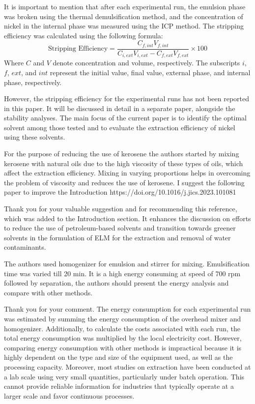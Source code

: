 \documentclass[11pt,answers]{exam}
\begin{document}
\begin{questions}
\begin{solutionorbox}[5.5cm]
It is important to mention that after each experimental run, the emulsion phase was broken using the thermal demulsification method, and the concentration of nickel in the internal phase was measured using the ICP method. The stripping efficiency was calculated using the following formula:
\begin{equation}
    \text{Stripping  Efficiency}=\frac{C_{f,int}V_{f,int}}{C_{i,ext}V_{i,ext}-C_{f,ext}V_{f,ext}}\times 100
\end{equation}
Where $C$ and $V$ denote concentration and volume, respectively. The subscripts $i$, $f$, $ext$, and $int$ represent the initial value, final value, external phase, and internal phase, respectively.

However, the stripping efficiency for the experimental runs has not been reported in this paper. It will be discussed in detail in a separate paper, alongside the stability analyses. The main focus of the current paper is to identify the optimal solvent among those tested and to evaluate the extraction efficiency of nickel using these solvents.
 \end{solutionorbox}
\question For the purpose of reducing the use of kerosene the authors started by mixing kerosene with natural oils due to the high viscosity of these types of oils, which affect the extraction efficiency. Mixing in varying proportions helps in overcoming the problem of viscosity and reduces the use of kerosene. I suggest the following paper to improve the Introduction https://doi.org/10.1016/j.jics.2023.101081
 \begin{solutionorbox}[5.5cm]

Thank you for your valuable suggestion and for recommending this reference, which was added to the Introduction section. It enhances the discussion on efforts to reduce the use of petroleum-based solvents and transition towards greener solvents in the formulation of ELM for the extraction and removal of water contaminants.
 
 \end{solutionorbox}
\question The authors used homogenizer for emulsion and stirrer for mixing.  Emulsification time was varied till 20 min. It is a high energy consuming at speed of 700 rpm followed by separation, the authors should present the energy analysis and compare with other methods.
 \begin{solutionorbox}[5.5cm]
Thank you for your comment. The energy consumption for each experimental run was estimated by summing the energy consumption of the overhead mixer and homogenizer. Additionally, to calculate the costs associated with each run, the total energy consumption was multiplied by the local electricity cost. However, comparing energy consumption with other methods is impractical because it is highly dependent on the type and size of the equipment used, as well as the processing capacity. Moreover, most studies on extraction have been conducted at a lab scale using very small quantities, particularly under batch operation. This cannot provide reliable information for industries that typically operate at a larger scale and favor continuous processes.


\end{solutionorbox}
\end{questions}
\end{document}
